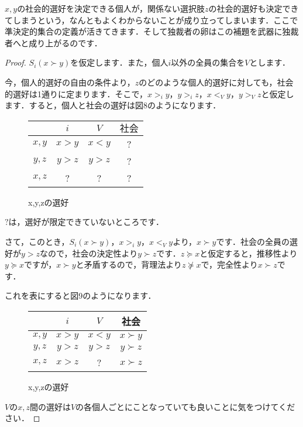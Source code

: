 $x,y$の社会的選好を決定できる個人が，関係ない選択肢$z$の社会的選好も決定できてしまうという，なんともよくわからないことが成り立ってしまいます．ここで準決定的集合の定義が活きてきます．そして独裁者の卵はこの補題を武器に独裁者へと成り上がるのです．

\begin{proof}
    $S_i(x \succ y)$を仮定します．また，個人$i$以外の全員の集合を$V$とします．

    今，個人的選好の自由の条件より，$z$のどのような個人的選好に対しても，社会的選好は1通りに定まります．そこで，$x >_i y$，$y >_i z$，$x <_V y$，$y >_V z$と仮定します．すると，個人と社会の選好は図8のようになります．
\begin{figure}[!h]
    \centering
    \begin{tabular}{|c|c|c|c|} \hline
        & $i$ & $V$ & $社会$ \\ \hline
        $x,y$ & $x > y$ & $x < y$ & ? \\ \hline
        $y,z$ & $y > z$ & $y > z$ & ? \\ \hline
        $x,z$ &    ?    &    ?    & ? \\ \hline
    \end{tabular}
    \caption{x,y,zの選好}
\end{figure}

$?$は，選好が限定できていないところです．

さて，このとき，$S_i(x \succ y)$，$x >_i y$，$x <_V y$より，$x \succ y$です．社会の全員の選好が$y > z$なので，社会の決定性より$y \succ z$です．$z \succeq x$と仮定すると，推移性より$y \succeq x$ですが，$x \succ y$と矛盾するので，背理法より$z \not \succeq x$で，完全性より$x \succ z$です．

これを表にすると図9のようになります．

\begin{figure}[!h]
    \centering
    \begin{tabular}{|c|c|c|c|} \hline
        & $i$ & $V$ & 社会 \\ \hline
        $x,y$ & $x > y$ & $x < y$ & $x \succ y$ \\ \hline
        $y,z$ & $y > z$ & $y > z$ & $y \succ z$ \\ \hline
        $x,z$ & $x > z$ &    ?    & $x \succ z$ \\ \hline
    \end{tabular}
    \caption{x,y,zの選好}
\end{figure}
$V$の$x,z$間の選好は$V$の各個人ごとにことなっていても良いことに気をつけてください．


\end{proof}
